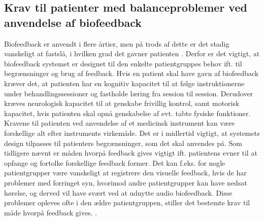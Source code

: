 \subsection{Krav til patienter med balanceproblemer ved anvendelse af biofeedback}
Biofeedback er anvendt i flere årtier, men på trods af dette er det stadig vanskeligt at fastslå, i hvilken grad det gavner patienten \cite{Glanz1997}. Derfor er det vigtigt, at biofeedback systemet er designet til den enkelte patientgruppes behov ift. til  begrænsninger og brug af feedback. Hvis en patient skal have gavn af biofeedback kræver det, at patienten har en kognitiv kapacitet til at følge instruktionerne under behandlingssessioner og fastholde læring fra session til session. Derudover kræves neurologisk kapacitet til at genskabe frivillig kontrol, samt motorisk kapacitet, hvis patienten skal opnå genskabelse af evt. tabte fysiske funktioner. \cite{Middaugh1989} Kravene til patienten ved anvendelse af et medicinsk instrument kan være forskellige alt efter instruments virkemåde. Det er i midlertid vigtigt, at systemets design tilpasses til patienters begrænsninger, som det skal anvendes på. Som tidligere nævnt er måden hvorpå feedback gives vigtigt ift. patientens evner til at opfange og fortolke forskellige feedback former. Det kan f.eks. for nogle patientgrupper være vanskeligt at registrere den visuelle feedback, hvis de har problemer med forringet syn, hvorimod andre patientgrupper kan have nedsat hørelse, og derved vil have svært ved at udnytte audio biofeedback.  Disse problemer opleves ofte i den ældre patientgruppen, stiller det bestemte krav til måde hvorpå feedback gives. \cite{Sundhedsstyrelsen2011}.  \\









